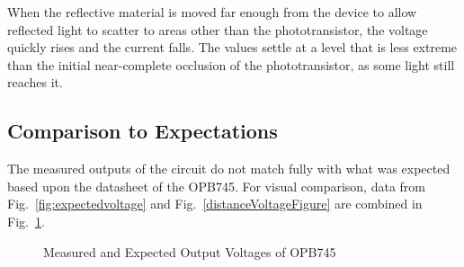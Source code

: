 \documentclass[conference]{IEEEtran}
\begin{document}
When the reflective material is moved far enough from the
device to allow reflected light to scatter to areas
other than the phototransistor, the voltage quickly rises and
the current falls. The values settle at a level that is
less extreme than the initial near-complete occlusion of
the phototransistor, as some light still reaches it.

\subsection{Comparison to Expectations}
The measured outputs of the circuit do not match fully with what was expected based upon
the datasheet of the OPB745. For visual comparison, data from Fig.~\ref{fig:expectedvoltage} and Fig.~\ref{distanceVoltageFigure}
are combined in Fig.~\ref{fig:expectedAndRealVoltage}.

\begin{figure}[htbp]
    \caption{Measured and Expected Output Voltages of OPB745}
    \label{fig:expectedAndRealVoltage}
\end{figure}
\end{document}
